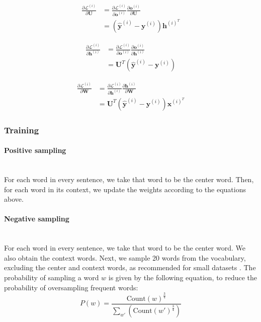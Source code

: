 \documentclass{article}
\numberwithin{equation}{section}
\begin{document}
\begin{equation}
\begin{split}
\frac{\partial \mathcal{L}^{(i)}}{\partial \bm{U}}
	&= \frac{\partial \mathcal{L}^{(i)}}{\partial \bm{o}^{(i)}} \frac{\partial \bm{o}^{(i)}}{\partial \bm{U}} \\
	&= (\hat{\bm{y}}^{(i)} - \bm{y}^{(i)}) \bm{h}^{(i)^T}
\end{split}
\end{equation}

\begin{equation}
\begin{split}
\frac{\partial \mathcal{L}^{(i)}}{\partial \bm{h}^{(i)}}
	&= \frac{\partial \mathcal{L}^{(i)}}{\partial \bm{o}^{(i)}} \frac{\partial \bm{o}^{(i)}}{\partial \bm{h}^{(i)}} \\
	&= \bm{U}^T(\hat{\bm{y}}^{(i)} - \bm{y}^{(i)})
\end{split}
\end{equation}

\begin{equation}
\begin{split}
\frac{\partial \mathcal{L}^{(i)}}{\partial \bm{W}}
	&= \frac{\partial \mathcal{L}^{(i)}}{\partial \bm{h}^{(i)}} \frac{\partial \bm{h}^{(i)}}{\partial \bm{W}} \\
	&= \bm{U}^T(\hat{\bm{y}}^{(i)} - \bm{y}^{(i)}) \bm{x}^{(i)^T}
\end{split}
\end{equation}

\subsubsection{Training}
\paragraph{Positive sampling}\mbox{}\\
For each word in every sentence, we take that word to be the center word. Then, for each word in its context, we update the weights according to the equations above.

\paragraph{Negative sampling}\mbox{}\\
For each word in every sentence, we take that word to be the center word. We also obtain the context words. Next, we sample 20 words from the vocabulary, excluding the center and context words, as recommended for small datasets \cite{DBLP:journals/corr/MikolovSCCD13}. The probability of sampling a word $w$ is given by the following equation, to reduce the probability of oversampling frequent words:
	$$ P(w) = \frac{\text{Count}(w)^\frac{3}{4}}{\sum_{w'}(\text{Count}(w')^\frac{3}{4})}  $$
\end{document}
